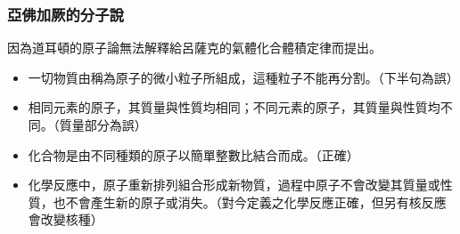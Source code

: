 \documentclass[a4paper,12pt]{article}
\begin{document}
\subsubsection{亞佛加厥的分子說}
因為道耳頓的原子論無法解釋給呂薩克的氣體化合體積定律而提出。
\begin{itemize}
\item 一切物質由稱為原子的微小粒子所組成，這種粒子不能再分割。（下半句為誤）
\item 相同元素的原子，其質量與性質均相同；不同元素的原子，其質量與性質均不同。（質量部分為誤）
\item 化合物是由不同種類的原子以簡單整數比結合而成。（正確）
\item 化學反應中，原子重新排列組合形成新物質，過程中原子不會改變其質量或性質，也不會產生新的原子或消失。（對今定義之化學反應正確，但另有核反應會改變核種）
\end{itemize}
\end{document}
